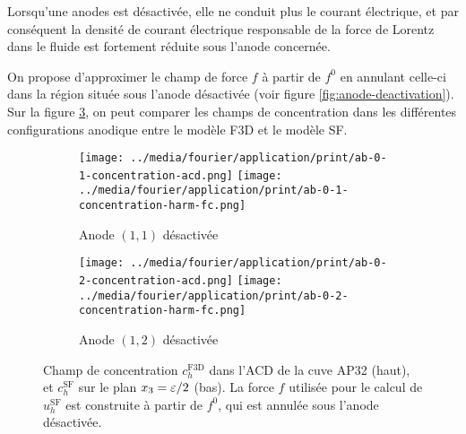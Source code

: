 Lorsqu'une anodes est désactivée, elle ne conduit plus le courant
électrique, et par conséquent la densité de courant électrique
responsable de la force de Lorentz dans le fluide est fortement
réduite sous l'anode concernée.

On propose d'approximer le champ de force $f$ à partir de $f^0$ en
annulant celle-ci dans la région située sous l'anode désactivée (voir
figure \ref{fig:anode-deactivation}). Sur la figure
\ref{fig:harmonic-concentration-comp-fc}, on peut comparer les champs
de concentration dans les différentes configurations anodique entre le
modèle F3D et le modèle SF.


\begin{figure}
\begin{center}
\begin{subfigure}[t]{\textwidth}
  \texttt{[image: ../media/fourier/application/print/ab-0-1-concentration-acd.png]}
  \texttt{[image: ../media/fourier/application/print/ab-0-1-concentration-harm-fc.png]}
  \caption{Anode $(1,1)$ désactivée}
  \label{}
\end{subfigure}

\begin{subfigure}[t]{\textwidth}
  \texttt{[image: ../media/fourier/application/print/ab-0-2-concentration-acd.png]}
  \texttt{[image: ../media/fourier/application/print/ab-0-2-concentration-harm-fc.png]}
  \caption{Anode $(1,2)$ désactivée}
  \label{}
\end{subfigure}


        \caption{Champ de concentration $c_h^\mathrm{F3D}$ dans l'ACD de
      la cuve AP32 (haut), et $c_h^\mathrm{SF}$ sur le plan
      $x_3 = \varepsilon / 2$ (bas). La force $f$ utilisée
      pour le calcul de $u_h^\mathrm{SF}$  est construite à
      partir de $f^0$, qui est annulée sous l'anode désactivée.}
\label{fig:harmonic-concentration-comp-fc}
\end{center}
\end{figure}

